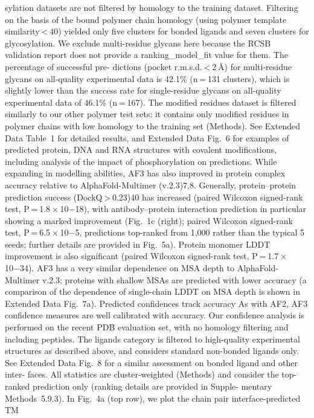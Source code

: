 sylation datasets are not filtered by homology to the training dataset.
Filtering on the basis of the bound polymer chain homology (using
polymer template similarity < 40) yielded only five clusters for bonded
ligands and seven clusters for glycosylation. We exclude multi-residue
glycans here because the RCSB validation report does not provide a
ranking\_model\_fit value for them. The percentage of successful pre-
dictions (pocket r.m.s.d. < 2 Å) for multi-residue glycans on all-quality
experimental data is 42.1\% (n = 131 clusters), which is slightly lower than
the success rate for single-residue glycans on all-quality experimental
data of 46.1\% (n = 167). The modified residues dataset is filtered similarly
to our other polymer test sets: it contains only modified residues in
polymer chains with low homology to the training set (Methods). See
Extended Data Table 1 for detailed results, and Extended Data Fig. 6 for
examples of predicted protein, DNA and RNA structures with covalent
modifications, including analysis of the impact of phosphorylation
on predictions.
While expanding in modelling abilities, AF3 has also improved in
protein complex accuracy relative to AlphaFold-Multimer (v.2.3)7,8.
Generally, protein–protein prediction success (DockQ > 0.23)40 has
increased (paired Wilcoxon signed-rank test, P = 1.8 × 10−18), with
antibody–protein interaction prediction in particular showing a
marked improvement (Fig. 1c (right); paired Wilcoxon signed-rank
test, P = 6.5 × 10−5, predictions top-ranked from 1,000 rather than the
typical 5 seeds; further details are provided in Fig. 5a). Protein monomer
LDDT improvement is also significant (paired Wilcoxon signed-rank
test, P = 1.7 × 10−34). AF3 has a very similar dependence on MSA depth
to AlphaFold-Multimer v.2.3; proteins with shallow MSAs are predicted
with lower accuracy (a comparison of the dependence of single-chain
LDDT on MSA depth is shown in Extended Data Fig. 7a).
Predicted confidences track accuracy
As with AF2, AF3 confidence measures are well calibrated with accuracy.
Our confidence analysis is performed on the recent PDB evaluation
set, with no homology filtering and including peptides. The ligands
category is filtered to high-quality experimental structures as described
above, and considers standard non-bonded ligands only. See Extended
Data Fig. 8 for a similar assessment on bonded ligand and other inter-
faces. All statistics are cluster-weighted (Methods) and consider the
top-ranked prediction only (ranking details are provided in Supple-
mentary Methods 5.9.3).
In Fig. 4a (top row), we plot the chain pair interface-predicted TM
